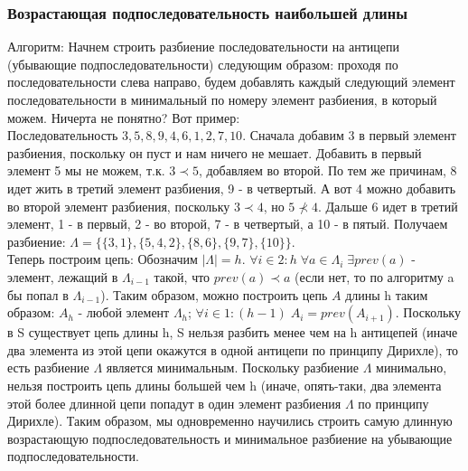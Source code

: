 \subsubsection{Возрастающая подпоследовательность наибольшей длины}
Алгоритм: Начнем строить разбиение последовательности на антицепи (убывающие подпоследовательности) следующим образом: проходя по последовательности слева направо, будем добавлять каждый следующий элемент последовательности в минимальный по номеру элемент разбиения, в который можем. Ничерта не понятно? Вот пример:\\
Последовательность $3, 5, 8, 9, 4, 6, 1, 2, 7, 10$. Сначала добавим 3 в первый элемент разбиения, поскольку он пуст и нам ничего не мешает. Добавить в первый элемент 5 мы не можем, т.к. $3 \prec 5$, добавляем во второй. По тем же причинам, 8 идет жить в третий элемент разбиения, 9 - в четвертый. А вот 4 можно добавить во второй элемент разбиения, поскольку $3 \prec 4$, но $5 \not\prec 4$. Дальше 6 идет в третий элемент, 1 - в первый, 2 - во второй, 7 - в четвертый, а 10 - в пятый. Получаем разбиение: $\Lambda = \{\{3, 1\}, \{5, 4, 2\}, \{8, 6\}, \{9, 7\}, \{10\}\}$.\\
Теперь построим цепь: Обозначим $|\Lambda| = h$. $\forall i \in 2:h \; \forall a \in \Lambda_i \; \exists prev(a)$ - элемент, лежащий в $\Lambda_{i - 1}$ такой, что $prev(a) \prec a$ (если нет, то по алгоритму a бы попал в $\Lambda_{i - 1}$). Таким образом, можно построить цепь $A$ длины h таким образом: $A_h$ - любой элемент $\Lambda_h$; $\forall i \in 1:(h - 1) \; A_i = prev(A_{i + 1})$. Поскольку в S существует цепь длины h, S нельзя разбить менее чем на h антицепей (иначе два элемента из этой цепи окажутся в одной антицепи по принципу Дирихле), то есть разбиение $\Lambda$ является минимальным. Поскольку разбиение $\Lambda$ минимально, нельзя построить цепь длины большей чем h (иначе, опять-таки, два элемента этой более длинной цепи попадут в один элемент разбиения $\Lambda$ по принципу Дирихле). Таким образом, мы одновременно научились строить самую длинную возрастающую подпоследовательность и минимальное разбиение на убывающие подпоследовательности.
